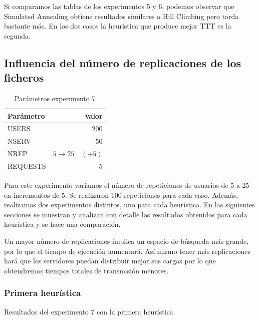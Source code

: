 Si comparamos las tablas de los experimentos 5 y 6, podemos observar que Simulated Annealing
obtiene resultados similares a Hill Climbing pero tarda bastante más. En los dos casos
la heurística que produce mejor TTT es la segunda.



\pagebreak
\subsection{Influencia del número de replicaciones de los ficheros}%
\label{sub:exp7}

\begin{table}[H]
    \caption{Parámetros experimento 7}%
    \label{tab:ex7_par}
    \begin{center}
    \begin{tabular}{lr}
    \toprule
    Parámetro & valor \\
    \midrule
    USERS & 200 \\
    NSERV & 50 \\
    NREP & $5 \to 25 \quad (+5)$ \\
    REQUESTS & 5\\
    \bottomrule
    \end{tabular}
    \end{center}
\end{table}

Para este experimento variamos el número de repeticiones de usuarios de 5 a 25 en incrementos de 5. Se realizaron 100
repeticiones para cada caso. Además, realizamos dos experimentos distintos, uno para cada heurística. En las
siguientes secciones se muestran y analizan con detalle los resultados obtenidos para cada heurística y se hace una
comparación.

\begin{hyp*}
    Un mayor número de replicaciones implica un espacio de búsqueda más grande, por lo que el tiempo de ejecución
    aumentará. Así mismo tener más replicaciones hará que los servidores puedan distribuir mejor sus cargas por
    lo que obtendremos tiempos totales de transmisión menores.
\end{hyp*}

\subsubsection{Primera heurística}
\begin{table}[H]
    \centering
    \caption{Resultados del experimento 7 con la primera heurística}%
    \label{tab:ex7}
    \begin{center}
    
    \end{center}
\end{table}

